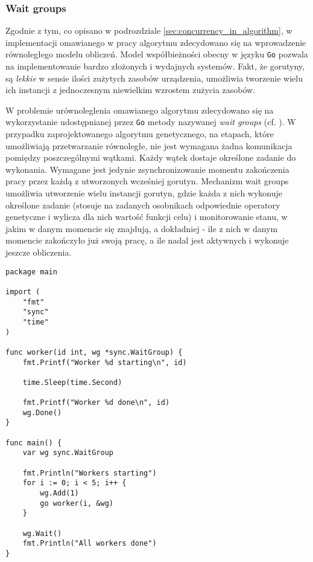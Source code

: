 \subsubsection{Wait groups}
\label{subsubsec:wait_groups}
Zgodnie z tym, co opisano w podrozdziale \ref{sec:concurrency_in_algorithm}, w implementacji omawianego w pracy algorytmu zdecydowano się na wprowadzenie równoległego modelu obliczeń. Model współbieżności obecny w języku \texttt{Go} pozwala na implementowanie bardzo złożonych i wydajnych systemów. Fakt, że gorutyny, są \textit{lekkie} w sensie ilości zużytych zasobów urządzenia, umożliwia tworzenie wielu ich instancji z jednoczesnym niewielkim wzrostem zużycia zasobów.

W problemie urównoleglenia omawianego algorytmu zdecydowano się na wykorzystanie udostępnianej przez \texttt{Go} metody nazywanej \textit{wait groups} (cf. \cite{GoDocsWaitGroups}). W przypadku zaprojektowanego algorytmu genetycznego, na etapach, które umożliwiają przetwarzanie równoległe, nie jest wymagana żadna komunikacja pomiędzy poszczególnymi wątkami. Każdy wątek dostaje określone zadanie do wykonania. Wymagane jest jedynie zsynchronizowanie momentu zakończenia pracy przez każdą z utworzonych wcześniej gorutyn. Mechanizm wait groups umożliwia utworzenie wielu instancji gorutyn, gdzie każda z nich wykonuje określone zadanie (stosuje na zadanych osobnikach odpowiednie operatory genetyczne i wylicza dla nich wartość funkcji celu) i monitorowanie stanu, w jakim w danym momencie się znajdują, a dokładniej - ile z nich w danym momencie zakończyło już swoją pracę, a ile nadal jest aktywnych i wykonuje jeszcze obliczenia. 

\begin{lstlisting}[caption={Mechanizm wait groups dostępny w bibliotece \texttt{sync} języka \texttt{Go}. Przedstawiany tutaj kod i jego działanie zostało opisane w sekcji \ref{subsubsec:wait_groups}}, captionpos=b, label={lst:wait_groups}]
package main

import (
	"fmt"
	"sync"
	"time"
)

func worker(id int, wg *sync.WaitGroup) {
	fmt.Printf("Worker %d starting\n", id)

	time.Sleep(time.Second)
	
	fmt.Printf("Worker %d done\n", id)
	wg.Done()
}

func main() {
	var wg sync.WaitGroup

	fmt.Println("Workers starting")
	for i := 0; i < 5; i++ {
		wg.Add(1)
		go worker(i, &wg)
	}

	wg.Wait()
	fmt.Println("All workers done")
}
\end{lstlisting}

